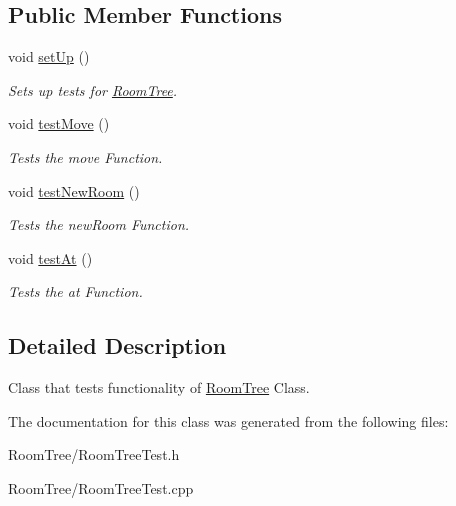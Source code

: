 \subsection*{Public Member Functions}
\begin{DoxyCompactItemize}
\item 
\hypertarget{classRoomTreeTest_ae70ed88d72b79d6615705caf5a635aca}{void \hyperlink{classRoomTreeTest_ae70ed88d72b79d6615705caf5a635aca}{set\-Up} ()}\label{classRoomTreeTest_ae70ed88d72b79d6615705caf5a635aca}

\begin{DoxyCompactList}\small\item\em Sets up tests for \hyperlink{classRoomTree}{Room\-Tree}. \end{DoxyCompactList}\item 
\hypertarget{classRoomTreeTest_aab3dedfa3aaa0bfab811a8d0d8c8b7e0}{void \hyperlink{classRoomTreeTest_aab3dedfa3aaa0bfab811a8d0d8c8b7e0}{test\-Move} ()}\label{classRoomTreeTest_aab3dedfa3aaa0bfab811a8d0d8c8b7e0}

\begin{DoxyCompactList}\small\item\em Tests the move Function. \end{DoxyCompactList}\item 
\hypertarget{classRoomTreeTest_a1f342a990eb4b60cfae96dac1dbbedee}{void \hyperlink{classRoomTreeTest_a1f342a990eb4b60cfae96dac1dbbedee}{test\-New\-Room} ()}\label{classRoomTreeTest_a1f342a990eb4b60cfae96dac1dbbedee}

\begin{DoxyCompactList}\small\item\em Tests the new\-Room Function. \end{DoxyCompactList}\item 
\hypertarget{classRoomTreeTest_a7999cf9d9149ade6f39fbb7be601805e}{void \hyperlink{classRoomTreeTest_a7999cf9d9149ade6f39fbb7be601805e}{test\-At} ()}\label{classRoomTreeTest_a7999cf9d9149ade6f39fbb7be601805e}

\begin{DoxyCompactList}\small\item\em Tests the at Function. \end{DoxyCompactList}\end{DoxyCompactItemize}


\subsection{Detailed Description}
Class that tests functionality of \hyperlink{classRoomTree}{Room\-Tree} Class. 

The documentation for this class was generated from the following files\-:\begin{DoxyCompactItemize}
\item 
Room\-Tree/Room\-Tree\-Test.\-h\item 
Room\-Tree/Room\-Tree\-Test.\-cpp\end{DoxyCompactItemize}
